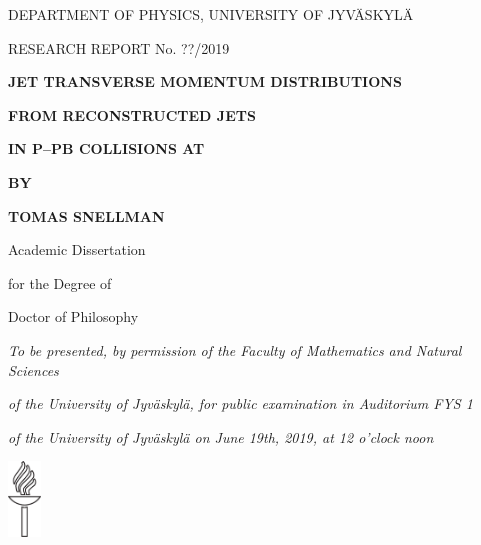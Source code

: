 



\thispagestyle{empty}
\vspace*{10mm}

\centerline{DEPARTMENT OF PHYSICS, UNIVERSITY OF JYV\"ASKYL\"A}
\centerline{RESEARCH REPORT No. ??/2019}

\vspace{25mm} 

\centerline{\bf JET TRANSVERSE MOMENTUM DISTRIBUTIONS }
\centerline{\bf  FROM RECONSTRUCTED JETS}

\centerline{\bf  IN P--PB COLLISIONS AT }
\centerline{\bf }
\vspace{13mm}


\centerline{\bf BY}
\centerline{\bf TOMAS SNELLMAN}

\vspace{13mm}

\centerline{Academic Dissertation}
\centerline{for the Degree of}
\centerline{Doctor of Philosophy}

\vspace{13mm}


\centerline{\emph{
To be presented, by permission of the Faculty of Mathematics and Natural Sciences}}
\centerline{\emph{
 of the University of Jyv\"askyl\"a, for public examination in Auditorium FYS 1}}
 \centerline{\emph{ of the University of Jyv\"askyl\"a on June 19th, 2019, at 12 o'clock noon}}

\vspace{13mm}



\centerline{\includegraphics[height=20mm]{Soihtu}}

